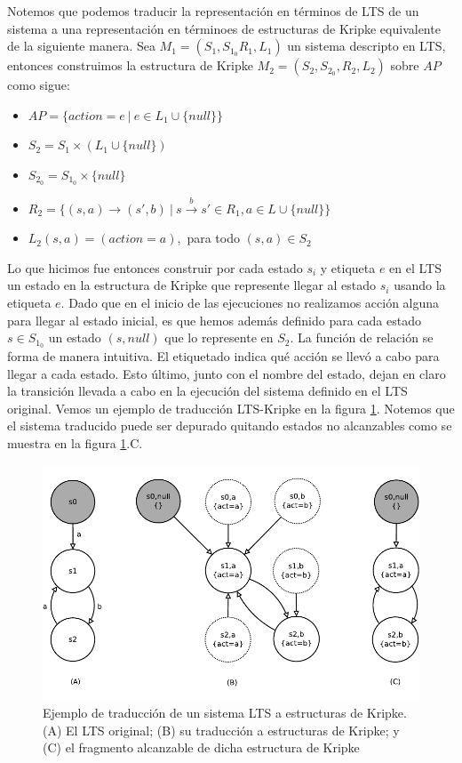 \documentclass[pdftex,a4paper,12pt]{book}
\begin{document}
Notemos que podemos traducir la representaci\'on en t\'erminos de LTS de un sistema a una representaci\'on en t\'erminoes de estructuras de Kripke equivalente de la siguiente manera. Sea $M_1 = (S_1, S_{1_0} R_1, L_1)$ un sistema descripto en LTS, entonces construimos la estructura de Kripke $M_2 = (S_2,S_{2_0},R_2,L_2)$ sobre $AP$ como sigue:
\begin{itemize}
\item $ AP = \{action = e ~|~ e \in L_1 \cup \{null\}\} $
\item $ S_2 = S_1 \times (L_1 \cup \{null\}) $
\item $S_{2_0} = S_{1_0} \times \{null\}$
\item $R_2 = \{(s,a) \rightarrow (s',b) ~|~ s\overset{b}{\rightarrow}s' \in R_1, a \in L \cup \{null\}\}$
\item $L_2(s,a) = (action = a),$ para todo $(s,a) \in S_2$
\end{itemize}
Lo que hicimos fue entonces construir por cada estado $s_i$ y etiqueta $e$ en el LTS un estado en la estructura de Kripke que represente llegar al estado $s_i$ usando la etiqueta $e$. Dado que en el inicio de las ejecuciones no realizamos acci\'on alguna para llegar al estado inicial, es que hemos adem\'as definido para cada estado $s \in S_{1_0}$ un estado $(s,null)$ que lo represente en $S_2$. La funci\'on de relaci\'on se forma de manera intuitiva. El etiquetado indica qu\'e acci\'on se llev\'o a cabo para llegar a cada estado. Esto \'ultimo, junto con el nombre del estado, dejan en claro la transici\'on llevada a cabo en la ejecuci\'on del sistema definido en el LTS original. Vemos un ejemplo de traducci\'on LTS-Kripke en la figura \ref{ltsakripke}. Notemos que el sistema traducido puede ser depurado quitando estados no alcanzables como se muestra en la figura \ref{ltsakripke}.C.

\begin{figure}[htp]
  \centering
    \includegraphics{Imagenes/ltsakripke.pdf}
  \caption{Ejemplo de traducci\'on de un sistema LTS a estructuras de Kripke. (A) El LTS original; (B) su traducci\'on a estructuras de Kripke; y (C) el fragmento alcanzable de dicha estructura de Kripke}
  \label{ltsakripke}
\end{figure}
\end{document}
